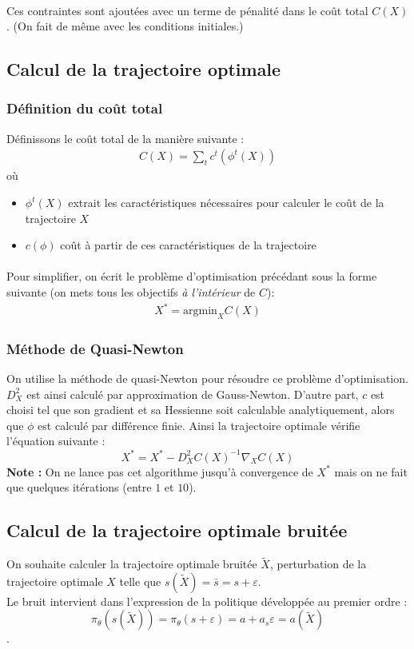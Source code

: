 \documentclass[a4paper,10pt]{article}
\begin{document}
\paragraph{}
  
  Ces contraintes sont ajoutées avec un terme de pénalité dans le coût total $C(X)$. (On fait de même avec les conditions initiales.)
  
\subsection{Calcul de la trajectoire optimale}
\subsubsection{Définition du coût total}
Définissons le coût total de la manière suivante : 
  \begin{align*}
  C(X) = \sum\limits_{t}c^t(\phi^t(X))
  \end{align*}
où 
  \begin{itemize}
  \item $\phi^t(X)$ extrait les caractéristiques nécessaires pour calculer le coût de la trajectoire $X$
  \item $c(\phi)$ coût à partir de ces caractéristiques de la trajectoire
\end{itemize} 
\paragraph{}
Pour simplifier, on écrit le problème d'optimisation précédant sous la forme suivante (on mets tous les objectifs \textit{à l'intérieur} de $C$): 
  \begin{align*}
  X^* = \text{argmin}_{X} C(X)
  \end{align*}
\subsubsection{Méthode de Quasi-Newton}
On utilise la méthode de quasi-Newton pour résoudre ce problème d'optimisation. $D^2_{X}$ est ainsi calculé par approximation de Gauss-Newton. D'autre part, $c$ est choisi tel que son gradient et sa Hessienne soit calculable analytiquement, alors que $\phi$ est calculé par différence finie.
Ainsi la trajectoire optimale vérifie l'équation suivante : 
  \[
  X^{*} = X^{*} - D^2_{X}C(X)^{-1}\nabla_{X}C(X) 
  \]
  \textbf{Note :} On ne lance pas cet algorithme jusqu'à convergence de $X^{*}$ mais on ne fait que quelques itérations (entre $1$ et $10$).
 \subsection{Calcul de la trajectoire optimale bruitée}
  On souhaite calculer la trajectoire optimale bruitée $\tilde{X}$, perturbation de la trajectoire optimale $X$ telle que $s(\tilde{X}) = \bar{s} = s + \varepsilon$. \\
  Le bruit intervient dans l'expression de la politique développée au premier ordre : 
  \[ \pi_{\theta}(s(\tilde{X})) = \pi_{\theta}(s + \varepsilon) = a + a_{s}\varepsilon = a(\tilde{X}) \]. 
\end{document}
